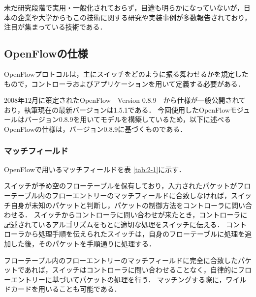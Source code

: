 未だ研究段階で実用・一般化されておらず，目途も明らかになっていないが，日本の企業や大学からもこの技術に関する研究や実装事例が多数報告されており，注目が集まっている技術である．

\subsection{OpenFlowの仕様}

OpenFlowプロトコルは，主にスイッチをどのように振る舞わせるかを規定したもので，コントローラおよびアプリケーションを用いて定義する必要がある．

2008年12月に策定されたOpenFlow　Version 0.8.9\cite{openflow}　から仕様が一般公開されており，執筆現在の最新バージョンは1.5.1である．
今回使用したOpenFlowモジュールはバージョン0.8.9を用いてモデルを構築しているため，以下に述べるOpenFlowの仕様は，バージョン0.8.9に基づくものである．

\subsubsection{マッチフィールド}

OpenFlowで用いるマッチフィールドを表 \ref{tab:2-1}に示す\cite{openflow}．

スイッチが予め空のフローテーブルを保有しており，入力されたパケットがフローテーブル内のフローエントリーのマッチフィールドに合致しなければ，スイッチ自身が未知のパケットと判断し，パケットの制御方法をコントローラに問い合わせる．
スイッチからコントローラに問い合わせが来たとき，コントローラに記述されているアルゴリズムをもとに適切な処理をスイッチに伝える．
コントローラから処理手順を伝えられたスイッチは，自身のフローテーブルに処理を追加した後，そのパケットを手順通りに処理する．

フローテーブル内のフローエントリーのマッチフィールドに完全に合致したパケットであれば，スイッチはコントローラに問い合わせることなく，自律的にフローエントリーに基づいてパケットの処理を行う．
マッチングする際に，ワイルドカードを用いることも可能である．

